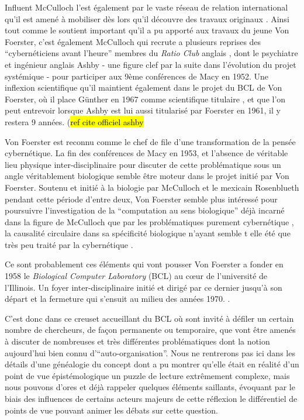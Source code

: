 Influent McCulloch l'est également par le vaste réseau de relation international qu'il est amené à mobiliser dès lors qu'il découvre des travaux originaux \autocites{Dupuy2005, Husbands2012, Levy1985}. Ainsi tout comme le soutient important qu'il a pu apporté aux travaux du jeune Von Foerster, c'est également McCulloch qui recrute a plusieurs reprises des \enquote{cybernéticiens avant l'heure} membres du \textit{Ratio Club} anglais , dont le psychiatre et ingénieur anglais Ashby - une figure clef par la suite dans l'évolution du projet systémique - pour participer aux 9ème conférences de Macy en 1952. Une inflexion scientifique qu'il maintient également dans le projet du BCL de Von Foerster, où il place Günther en 1967 comme scientifique titulaire , et que l'on peut entrevoir lorsque Ashby est lui aussi titularisé par Foerster en 1961, il y restera 9 années. (\hl{ref cite officiel ashby}

Von Foerster est reconnu comme le chef de file d'une transformation de la pensée cybernétique. La fin des conférences de Macy en 1953, et l'absence de véritable lieu physique inter-disciplinaire pour discuter de cette problématique sous un angle véritablement biologique semble être moteur dans le projet initié par Von Foerster. Soutenu et initié à la biologie par McCulloch et le mexicain Rosenblueth pendant cette période d'entre deux, Von Foerster semble plus intéressé pour poursuivre l'investigation de la \enquote{computation au sens biologique} déjà incarné dans la figure de McCulloch que par les problématiques purement cybernétique , la causalité circulaire dans sa spécificité biologique n'ayant semble t elle été que très peu traité par la cybernétique . 

Ce sont probablement ces éléments qui vont pousser Von Foerster a fonder en 1958 le \textit{Biological Computer Laboratory} (BCL) au cœur de l'université de l'Illinois. Un foyer inter-disciplinaire initié et dirigé par ce dernier jusqu'à son départ et la fermeture qui s'ensuit au milieu des années 1970. \autocite{Proulx2003}.

C'est donc dans ce creuset accueillant du BCL où sont invité à défiler un certain nombre de chercheurs, de façon permanente ou temporaire, que vont être amenés à discuter de nombreuses et très différentes problématiques dont la notion aujourd'hui bien connu d'\enquote{auto-organisation}. Nous ne rentrerons pas ici dans les détails d'une généalogie du concept dont \textcite{Stengers1985}  a pu montrer qu'elle était en réalité d'un point de vue épistémologique un puzzle de lecture extrêmement complexe, mais nous pouvons d'ores et déjà rappeler quelques éléments saillants, évoquant par le biais des influences de certains acteurs majeurs de cette réflexion le différentiel de points de vue pouvant animer les débats sur cette question.

